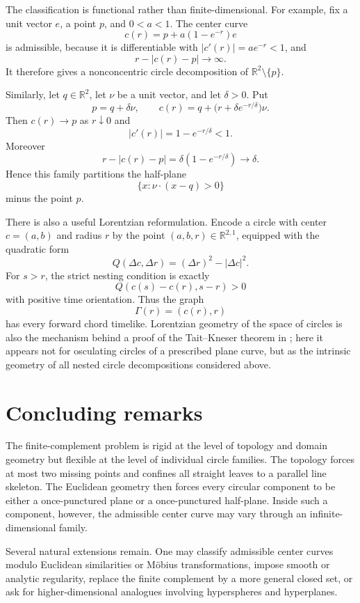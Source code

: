 \documentclass[11pt]{article}
\newcommand{\R}{\mathbb{R}}
\begin{document}
The classification is functional rather than finite-dimensional. For example, fix a unit vector $e$, a point $p$, and $0<a<1$. The center curve
\[
c(r)=p+a(1-e^{-r})e
\]
is admissible, because it is differentiable with $|c'(r)|=ae^{-r}<1$, and
\[
r-|c(r)-p|\longrightarrow\infty.
\]
It therefore gives a nonconcentric circle decomposition of $\R^2\setminus\{p\}$.

Similarly, let $q\in\R^2$, let $\nu$ be a unit vector, and let $\delta>0$. Put
\[
p=q+\delta\nu,
\qquad
c(r)=q+\bigl(r+\delta e^{-r/\delta}\bigr)\nu.
\]
Then $c(r)\to p$ as $r\downarrow0$ and
\[
|c'(r)|=1-e^{-r/\delta}<1.
\]
Moreover
\[
r-|c(r)-p|=\delta(1-e^{-r/\delta})\longrightarrow\delta.
\]
Hence this family partitions the half-plane
\[
\{x:\nu\cdot(x-q)>0\}
\]
minus the point $p$.

There is also a useful Lorentzian reformulation. Encode a circle with center $c=(a,b)$ and radius $r$ by the point $(a,b,r)\in\R^{2,1}$, equipped with the quadratic form
\[
Q(\Delta c,\Delta r)=(\Delta r)^2-|\Delta c|^2.
\]
For $s>r$, the strict nesting condition is exactly
\[
Q(c(s)-c(r),s-r)>0
\]
with positive time orientation. Thus the graph
\[
\Gamma(r)=(c(r),r)
\]
has every forward chord timelike. Lorentzian geometry of the space of circles is also the mechanism behind a proof of the Tait--Kneser theorem in \cite{BorJackmanTabachnikov}; here it appears not for osculating circles of a prescribed plane curve, but as the intrinsic geometry of all nested circle decompositions considered above.

\section{Concluding remarks}

The finite-complement problem is rigid at the level of topology and domain geometry but flexible at the level of individual circle families. The topology forces at most two missing points and confines all straight leaves to a parallel line skeleton. The Euclidean geometry then forces every circular component to be either a once-punctured plane or a once-punctured half-plane. Inside such a component, however, the admissible center curve may vary through an infinite-dimensional family.

Several natural extensions remain. One may classify admissible center curves modulo Euclidean similarities or M\"obius transformations, impose smooth or analytic regularity, replace the finite complement by a more general closed set, or ask for higher-dimensional analogues involving hyperspheres and hyperplanes.
\end{document}
